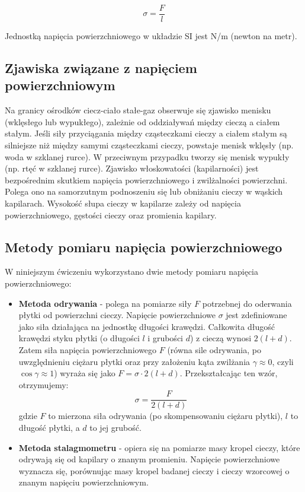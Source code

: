 \documentclass[a4paper,12pt]{article}
\begin{document}
\begin{equation}
    \sigma = \frac{F}{l}
\end{equation}

Jednostką napięcia powierzchniowego w układzie SI jest N/m (newton na metr).
\subsection{Zjawiska związane z napięciem powierzchniowym}

Na granicy ośrodków ciecz-ciało stałe-gaz obserwuje się zjawisko menisku (wklęsłego lub wypukłego), zależnie od oddziaływań między cieczą a ciałem stałym.
Jeśli siły przyciągania między cząsteczkami cieczy a ciałem stałym są silniejsze niż między samymi cząsteczkami cieczy, powstaje menisk wklęsły (np. woda w szklanej rurce).
W przeciwnym przypadku tworzy się menisk wypukły (np. rtęć w szklanej rurce).
Zjawisko włoskowatości (kapilarności) jest bezpośrednim skutkiem napięcia powierzchniowego i zwilżalności powierzchni.
Polega ono na samorzutnym podnoszeniu się lub obniżaniu cieczy w wąskich kapilarach.
Wysokość słupa cieczy w kapilarze zależy od napięcia powierzchniowego, gęstości cieczy oraz promienia kapilary.
\subsection{Metody pomiaru napięcia powierzchniowego}

W niniejszym ćwiczeniu wykorzystano dwie metody pomiaru napięcia powierzchniowego:

\begin{itemize}
    \item \textbf{Metoda odrywania} - polega na pomiarze siły $F$ potrzebnej do oderwania płytki od powierzchni cieczy.
          Napięcie powierzchniowe $\sigma$ jest zdefiniowane jako siła działająca na jednostkę długości krawędzi.
          Całkowita długość krawędzi styku płytki (o długości $l$ i grubości $d$) z cieczą wynosi $2(l+d)$.
          Zatem siła napięcia powierzchniowego $F$ (równa sile odrywania, po uwzględnieniu ciężaru płytki oraz przy założeniu kąta zwilżania $\gamma \approx 0$, czyli $\cos\gamma \approx 1$) wyraża się jako $F = \sigma \cdot 2(l+d)$.
          Przekształcając ten wzór, otrzymujemy:
          \begin{equation}
              \sigma = \frac{F}{2(l+d)} \label{eq:odrywanie}
          \end{equation}
          gdzie $F$ to mierzona siła odrywania (po skompensowaniu ciężaru płytki), $l$ to długość płytki, a $d$ to jej grubość.
    \item \textbf{Metoda stalagmometru} - opiera się na pomiarze masy kropel cieczy, które odrywają się od kapilary o znanym promieniu.
          Napięcie powierzchniowe wyznacza się, porównując masy kropel badanej cieczy i cieczy wzorcowej o znanym napięciu powierzchniowym.
\end{itemize}
\end{document}
